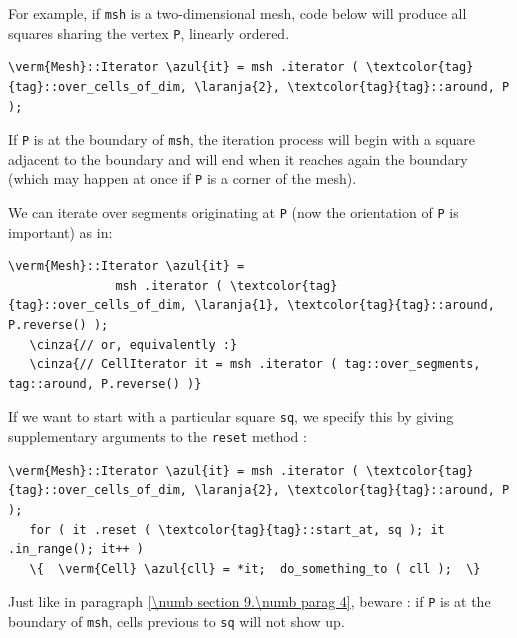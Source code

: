 For example, if {\small\tt msh} is a two-dimensional mesh, code below will produce
all squares sharing the vertex {\small\tt P}, linearly ordered.

\begin{Verbatim}[commandchars=\\\{\},formatcom=\small\tt,
   baselinestretch=0.94,framesep=2mm                      ]
   \verm{Mesh}::Iterator \azul{it} = msh .iterator ( \textcolor{tag}{tag}::over_cells_of_dim, \laranja{2}, \textcolor{tag}{tag}::around, P );
\end{Verbatim}

If {\small\tt P} is at the boundary of {\small\tt msh}, the iteration process will begin
with a square adjacent to the boundary and will end when it reaches again the boundary
(which may happen at once if {\small\tt P} is a corner of the mesh).

We can iterate over segments originating at {\small\tt P} (now the orientation of
{\small\tt P} is important) as in:

\begin{Verbatim}[commandchars=\\\{\},formatcom=\small\tt,
   baselinestretch=0.94,framesep=2mm                      ]
   \verm{Mesh}::Iterator \azul{it} = 
               msh .iterator ( \textcolor{tag}{tag}::over_cells_of_dim, \laranja{1}, \textcolor{tag}{tag}::around, P.reverse() );
   \cinza{// or, equivalently :}
   \cinza{// CellIterator it = msh .iterator ( tag::over_segments, tag::around, P.reverse() )}
\end{Verbatim}

If we want to start with a particular square {\small\tt sq}, we specify this by giving
supplementary arguments to the {\small\tt reset} method :

\begin{Verbatim}[commandchars=\\\{\},formatcom=\small\tt,
   baselinestretch=0.94,framesep=2mm                      ]
   \verm{Mesh}::Iterator \azul{it} = msh .iterator ( \textcolor{tag}{tag}::over_cells_of_dim, \laranja{2}, \textcolor{tag}{tag}::around, P );
   for ( it .reset ( \textcolor{tag}{tag}::start_at, sq ); it .in_range(); it++ )
   \{  \verm{Cell} \azul{cll} = *it;  do_something_to ( cll );  \}
\end{Verbatim}

Just like in paragraph \ref{\numb section 9.\numb parag 4}, beware : if {\small\tt P}
is at the boundary of {\small\tt msh}, cells previous to {\small\tt sq} will not
show up.

